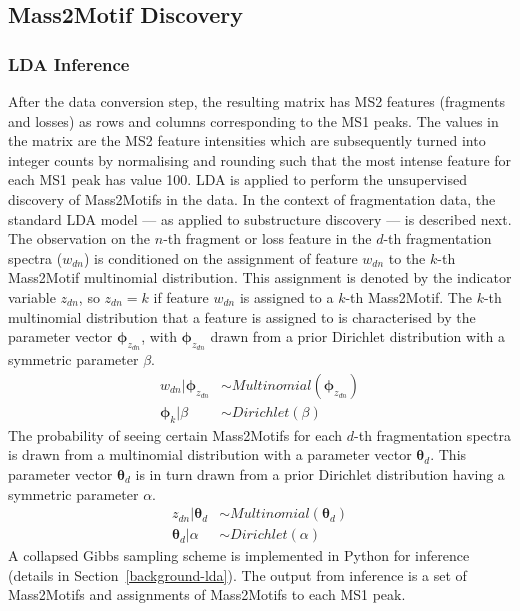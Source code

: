 \subsection{Mass2Motif Discovery\label{sub:topic-discovery}}

\subsubsection{LDA Inference}

After the data conversion step, the resulting matrix has MS2 features (fragments and losses) as rows and columns corresponding to the MS1 peaks. The values in the matrix are the MS2 feature intensities which are subsequently turned into integer counts by normalising and rounding such that the most intense feature for each MS1 peak has value 100. LDA is applied to perform the unsupervised discovery of Mass2Motifs in the data. In the context of fragmentation data, the standard LDA model --- as applied to substructure discovery --- is described next. The observation on the $n$-th fragment or loss feature in the $d$-th fragmentation spectra ($w_{dn}$) is conditioned on the assignment of feature $w_{dn}$ to the $k$-th Mass2Motif multinomial distribution. This assignment is denoted by the indicator variable $z_{dn}$, so $z_{dn}=k$ if feature $w_{dn}$ is assigned to a $k$-th Mass2Motif. The $k$-th multinomial distribution that a feature is assigned to is characterised by the parameter vector $\boldsymbol{\phi}_{z_{dn}}$, with $\boldsymbol{\phi}_{z_{dn}}$ drawn from a prior Dirichlet distribution with a symmetric parameter $\beta$. 
\begin{align}
w_{dn} \vert \boldsymbol{\phi}_{z_{dn}} &\sim Multinomial(\boldsymbol{\phi}_{z_{dn}}) \\
\boldsymbol{\phi}_{k} \vert \beta &\sim Dirichlet(\beta)
\end{align}
The probability of seeing certain Mass2Motifs for each $d$-th fragmentation spectra is drawn from a multinomial distribution with a parameter vector $\boldsymbol{\theta}_{d}$. This parameter vector $\boldsymbol{\theta}_{d}$ is in turn drawn from a prior Dirichlet distribution having a symmetric parameter $\alpha$. 
\begin{align}
z_{dn} \vert \boldsymbol{\theta}_{d} &\sim Multinomial(\boldsymbol{\theta}_{d}) \\
\boldsymbol{\theta}_{d} \vert \alpha &\sim Dirichlet(\alpha)
\end{align}
A collapsed Gibbs sampling scheme is implemented in Python for inference (details in Section~\ref{background-lda}). The output from inference is a set of Mass2Motifs and assignments of Mass2Motifs to each MS1 peak. 

